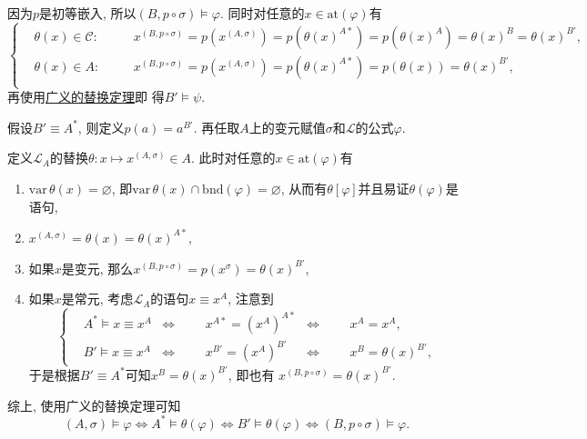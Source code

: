 因为$p$是初等嵌入, 所以$(B,p\circ\sigma)\models\varphi$.
同时对任意的$x\in\mathrm{at}(\varphi)$有
\[\left\{\begin{aligned}
    &\theta(x)\in\mathcal{C}:\quad
    &&x^{(B,p\circ\sigma)}=p(x^{(A,\sigma)})=p(\theta(x)^{A*})=
    p(\theta(x)^A)=\theta(x)^B=\theta(x)^{B'},\\[-3pt]
    &\theta(x)\in A:\quad
    &&x^{(B,p\circ\sigma)}=p(x^{(A,\sigma)})=p(\theta(x)^{A*})=
    p(\theta(x))=\theta(x)^{B'},\\[3pt]
\end{aligned}\right.\]
再使用\href{../02 一阶语义/04 替换定理#nameddest=sec:定理2.1}{广义的替换定理}即
得$B'\models\psi$.


假设$B'\equiv A^*$, 则定义$p(a)=a^{B'}$.
再任取$A$上的变元赋值$\sigma$和$\mathcal{L}$的公式$\varphi$.

定义$\mathcal{L}_A$的替换$\theta:x\mapsto x^{(A,\sigma)}\in A$.
此时对任意的$x\in\mathrm{at}(\varphi)$有
\begin{enumerate}
    \item $\mathrm{var}\,\theta(x)=\varnothing$, 即$
    \mathrm{var}\,\theta(x)\cap\mathrm{bnd}(\varphi)=\varnothing$,
    从而有$\theta[\varphi]$并且易证$\theta(\varphi)$是语句,
    \item $x^{(A,\sigma)}=\theta(x)=\theta(x)^{A*}$,
    \item 如果$x$是变元, 那么$x^{(B,p\circ\sigma)}=p(x^\sigma)=\theta(x)^{B'}$,
    \item 如果$x$是常元, 考虑$\mathcal{L}_A$的语句$x\equiv x^A$, 注意到
    \[\left\{\begin{aligned}
        &A^*\models x\equiv x^A&\iff&&&x^{A*}=(x^A)^{A*}&\iff&&&x^A=x^A,\\[-3pt]
        &B'\models x\equiv x^A&\iff&&&x^{B'}=(x^A)^{B'}&\iff&&&x^B=\theta(x)^{B'},
    \end{aligned}\right.\]
    于是根据$B'\equiv A^*$可知$x^B=\theta(x)^{B'}$, 即也有
    $x^{(B,p\circ\sigma)}=\theta(x)^{B'}$.
\end{enumerate}

综上, 使用广义的替换定理可知
\begin{equation*}
    (A,\sigma)\models\varphi\iff A^*\models\theta(\varphi)\iff
    B'\models\theta(\varphi)\iff(B,p\circ\sigma)\models\varphi.
\tag*{\qedsymbol}\end{equation*}

